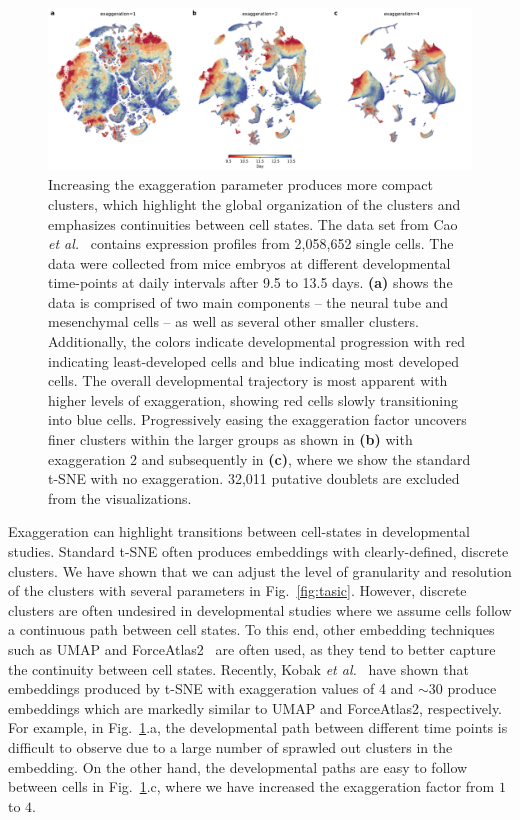 \documentclass[twocolumn]{bmcart}
\begin{document}
\begin{figure}[htbp]
  \includegraphics[width=\textwidth]{cao2019}
  \caption{\label{fig:cao}Increasing the exaggeration parameter produces more
  	compact clusters, which highlight the global organization of the clusters
  	and emphasizes continuities between cell states. The data set from Cao \textit{et
	al.}~\cite{cao2019single} contains expression profiles from 2,058,652
	single cells. The data were collected from mice embryos at different
	developmental time-points at daily intervals after 9.5 to 13.5 days.
	\textbf{(a)} shows the data is comprised of two main components -- the
	neural tube and mesenchymal cells -- as well as several other smaller
	clusters. Additionally, the colors indicate developmental progression
	with red indicating least-developed cells and blue indicating most
	developed cells. The overall developmental trajectory is most apparent
	with higher levels of exaggeration, showing red cells slowly
	transitioning into blue cells. Progressively easing the exaggeration
	factor uncovers finer clusters within the larger groups as shown in
	\textbf{(b)} with exaggeration 2 and subsequently in \textbf{(c)},
	where we show the standard t-SNE with no exaggeration. 32,011 putative
	doublets are excluded from the visualizations.}
\end{figure}

Exaggeration can highlight transitions between cell-states in
developmental studies. Standard t-SNE often produces embeddings with
clearly-defined, discrete clusters. We have shown that we can adjust the level
of granularity and resolution of the clusters with several parameters in Fig.~\ref{fig:tasic}. However,
discrete clusters are often undesired in developmental studies where we assume
cells follow a continuous path between cell states. To this end, other
embedding techniques such as UMAP and ForceAtlas2~\cite{jacomy2014forceatlas2}
are often used, as they tend to better capture the continuity between cell
states. Recently, Kobak \textit{et al.}~\cite{TODO} have shown that embeddings
produced by t-SNE with exaggeration values of 4 and $\sim30$ produce embeddings
which are markedly similar to UMAP and ForceAtlas2, respectively. For example,
in Fig.~\ref{fig:cao}.a, the developmental path between different time points
is difficult to observe due to a large number of sprawled out clusters in the
embedding. On the other hand, the developmental paths are easy to follow
between cells in Fig.~\ref{fig:cao}.c, where we have increased the exaggeration
factor from $1$ to $4$.
\end{document}

